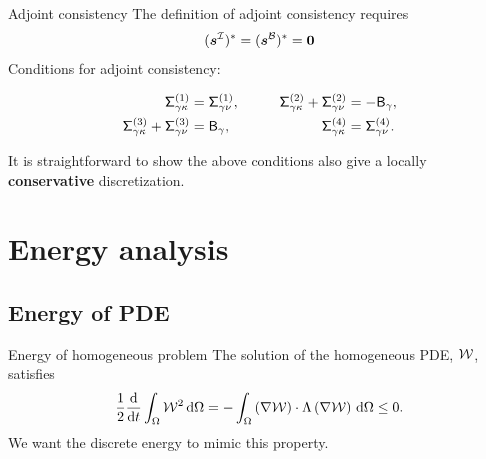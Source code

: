\documentclass{beamer}
\begin{document}
\begin{frame}{Adjoint consistency}
    The definition of adjoint consistency requires 
    \begin{equation*}
        (\bm{s}^{\mathcal{I}})^{*} = (\bm{s}^{\mathcal{B}})^{*} = \bm{0}
    \end{equation*}
    Conditions for adjoint consistency:
    \begin{block}{}
        \begin{equation*}
        \begin{aligned}
        \mathsf{\Sigma}_{\gamma\kappa}^{(1)} &= \mathsf{\Sigma}_{\gamma\nu} ^{(1)}, &\qquad  
        \mathsf{\Sigma}_{\gamma\kappa}^{(2)} + \mathsf{\Sigma}_{\gamma\nu} ^{(2)} &= -\mathsf{B}_{\gamma}, \\
        \mathsf{\Sigma}_{\gamma\kappa}^{(3)} + \mathsf{\Sigma}_{\gamma\nu} ^{(3)} &= \mathsf{B}_{\gamma}, &\qquad
        \mathsf{\Sigma}_{\gamma\kappa}^{(4)} &= \mathsf{\Sigma}_{\gamma\nu} ^{(4)}.
        \end{aligned}
        \end{equation*}
    \end{block}

\vskip 5mm
It is straightforward to show the above conditions also give a locally \textbf{conservative} discretization.

\end{frame}

\section{Energy analysis}
\subsection{Energy of PDE}
\begin{frame} {Energy of homogeneous problem}
    The solution of the homogeneous PDE, $\mathcal{W}$, satisfies
    \begin{equation*}
    \frac{1}{2} \frac{\mathrm{d}}{\mathrm{d} t} \int_{\Omega} \mathcal{W}^{2} \, \mathrm{d} \Omega
    = - \int_{\Omega} \left(\nabla \mathcal{W}\right) \cdot \Lambda \left(\nabla \mathcal{W} \right) \, \mathrm{d} \Omega
    \le 0.
    \end{equation*}
    We want the discrete energy to mimic this property.
\end{frame}
\end{document}
